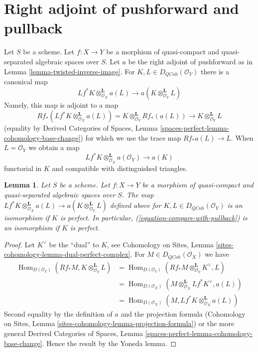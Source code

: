 \documentclass{stacks-project}
\theoremstyle{plain}
\newtheorem{lemma}[subsection]{Lemma}
\theoremstyle{definition}
\theoremstyle{remark}
\numberwithin{equation}{subsection}
\def\Hom{\mathop{\mathrm{Hom}}\nolimits}
\def\QCoh{\mathit{QCoh}}
\begin{document}
\section{Right adjoint of pushforward and pullback}
\label{section-compare-with-pullback}

\noindent
Let $S$ be a scheme.
Let $f : X \to Y$ be a morphism of quasi-compact and quasi-separated
algebraic spaces over $S$.
Let $a$ be the right adjoint of pushforward as in
Lemma \ref{lemma-twisted-inverse-image}. For $K, L \in D_\QCoh(\mathcal{O}_Y)$
there is a canonical map
$$
Lf^*K \otimes^\mathbf{L}_{\mathcal{O}_X} a(L)
\longrightarrow
a(K \otimes_{\mathcal{O}_Y}^\mathbf{L} L)
$$
Namely, this map is adjoint to a map
$$
Rf_*(Lf^*K \otimes^\mathbf{L}_{\mathcal{O}_X} a(L)) =
K \otimes^\mathbf{L}_{\mathcal{O}_Y} Rf_*(a(L))
\longrightarrow
K \otimes^\mathbf{L}_{\mathcal{O}_Y} L
$$
(equality by Derived Categories of Spaces, Lemma
\ref{spaces-perfect-lemma-cohomology-base-change})
for which we use the trace map $Rf_*a(L) \to L$.
When $L = \mathcal{O}_Y$ we obtain a map
\begin{equation}
\label{equation-compare-with-pullback}
Lf^*K \otimes^\mathbf{L}_{\mathcal{O}_X} a(\mathcal{O}_Y) \longrightarrow a(K)
\end{equation}
functorial in $K$ and compatible with distinguished triangles.

\begin{lemma}
\label{lemma-compare-with-pullback-perfect}
Let $S$ be a scheme.
Let $f : X \to Y$ be a morphism of quasi-compact and quasi-separated
algebraic spaces over $S$. The map
$Lf^*K \otimes^\mathbf{L}_{\mathcal{O}_X} a(L) \to
a(K \otimes_{\mathcal{O}_Y}^\mathbf{L} L)$
defined above for $K, L \in D_\QCoh(\mathcal{O}_Y)$
is an isomorphism if $K$ is perfect. In particular,
(\ref{equation-compare-with-pullback}) is an isomorphism if $K$ is perfect.
\end{lemma}

\begin{proof}
Let $K^\vee$ be the ``dual'' to $K$, see
Cohomology on Sites, Lemma \ref{sites-cohomology-lemma-dual-perfect-complex}.
For $M \in D_\QCoh(\mathcal{O}_X)$ we have
\begin{align*}
\Hom_{D(\mathcal{O}_Y)}(Rf_*M, K \otimes^\mathbf{L}_{\mathcal{O}_Y} L)
& =
\Hom_{D(\mathcal{O}_Y)}(
Rf_*M \otimes^\mathbf{L}_{\mathcal{O}_Y} K^\vee, L) \\
& =
\Hom_{D(\mathcal{O}_X)}(
M \otimes^\mathbf{L}_{\mathcal{O}_X} Lf^*K^\vee, a(L)) \\
& =
\Hom_{D(\mathcal{O}_X)}(M,
Lf^*K \otimes^\mathbf{L}_{\mathcal{O}_X} a(L))
\end{align*}
Second equality by the definition of $a$ and the projection formula
(Cohomology on Sites, Lemma
\ref{sites-cohomology-lemma-projection-formula})
or the more general Derived Categories of Spaces, Lemma
\ref{spaces-perfect-lemma-cohomology-base-change}.
Hence the result by the Yoneda lemma.
\end{proof}
\end{document}
